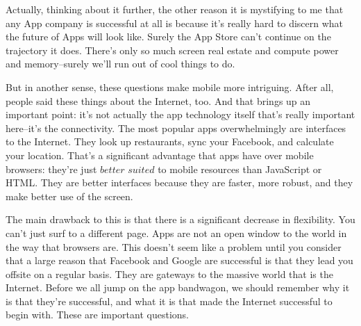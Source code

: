 \documentclass[a4paper]{article}
\begin{document}
Actually, thinking about it further, the other reason it is mystifying to me that any App company is successful at all is because it's really hard to discern what the future of Apps will look like. Surely the App Store can't continue on the trajectory it does. There's only so much screen real estate and compute power and memory--surely we'll run out of cool things to do.

But in another sense, these questions make mobile more intriguing. After all, people said these things about the Internet, too. And that brings up an important point: it's not actually the app technology itself that's really important here--it's the connectivity. The most popular apps overwhelmingly are interfaces to the Internet. They look up restaurants, sync your Facebook, and calculate your location. That's a significant advantage that apps have over mobile browsers: they're just $\textit{better suited}$ to mobile resources than JavaScript or HTML. They are better interfaces because they are faster, more robust, and they make better use of the screen.

The main drawback to this is that there is a significant decrease in flexibility. You can't just surf to a different page. Apps are not an open window to the world in the way that browsers are. This doesn't seem like a problem until you consider that a large reason that Facebook and Google are successful is that they lead you offsite on a regular basis. They are gateways to the massive world that is the Internet. Before we all jump on the app bandwagon, we should remember why it is that they're successful, and what it is that made the Internet successful to begin with. These are important questions.
\end{document}
